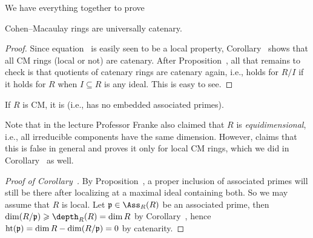\documentclass[a4paper,parskip=half,numbers=enddot, DIV=12]{scrreprt}
\renewcommand{\geq}{\geqslant}
\begin{document}
We have everything together to prove
\begin{thm}
	Cohen--Macaulay rings are universally catenary.
\end{thm}
\begin{proof}
	Since equation~ is easily seen to be a local property, Corollary~ shows that all CM rings (local or not) are catenary. After Proposition~, all that remains to check is that quotients of catenary rings are catenary again, i.e.,  holds for $R/I$ if it holds for $R$ when $I\subseteq R$ is any ideal. This is easy to see. 
\end{proof}
\begin{cor}
	If $R$ is CM, it is  (i.e., has no embedded associated primes).
\end{cor}
\begin{rem*}
	Note that in the lecture Professor Franke also claimed that $R$ is \emph{equidimensional}, i.e., all irreducible components have the same dimension. However, \cite[p.\ 458]{eisenbudCommAlg} claims that this is false in general and proves it only for local CM rings, which we did in Corollary~ as well.
\end{rem*}
\begin{proof}[Proof of Corollary~]
	By Proposition~, a proper inclusion of associated primes will still be there after localizing at a maximal ideal containing both. So we may assume that $R$ is local. Let $\pp\in\Ass_R(R)$ be an associated prime, then $\dim(R/\pp)\geq\depth_R(R)=\dim R$ by Corollary~, hence $\operatorname{ht}(\mathfrak{p})=\dim R-\dim (R/\mathfrak{p})=0$ by catenarity. 
\end{proof}
\end{document}
